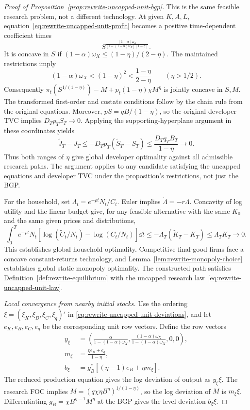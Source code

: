 \begin{proof}[Proof of Proposition~\ref{prop:rewrite-uncapped-unit-bgp}]
This is the same feasible research problem, not a different technology.
At given $K,A,L$, equation~\eqref{eq:rewrite-uncapped-unit-profit} becomes
a positive time-dependent coefficient times
\[
 S^{\frac{(1-\alpha)\omega_X}
 {[1-(1-\alpha)\omega_X](1-\eta)}}.
\]
It is concave in $S$ if
$(1-\alpha)\omega_X\leq(1-\eta)/(2-\eta)$. The maintained restrictions imply
\[
 (1-\alpha)\omega_X<(1-\eta)^2
 <\frac{1-\eta}{2-\eta}\qquad(\eta>1/2).
\]
Consequently $\pi_t(S^{1/(1-\eta)})-M+p_t(1-\eta)\chi M^\eta$
is jointly concave in $S,M$. The transformed first-order and costate
conditions follow by the chain rule from the original equations.
Moreover, $pS=qB/(1-\eta)$, so the original developer TVC implies
$D_Tp_TS_T\to0$. Applying the supporting-hyperplane argument in these
coordinates yields
\[
 \widetilde J_T-J_T
 \leq-D_Tp_T(\widetilde S_T-S_T)
 \leq\frac{D_Tq_TB_T}{1-\eta}\longrightarrow0.
\]
Thus both ranges of $\eta$ give global developer optimality against all
admissible research paths. The argument applies to any candidate satisfying
the uncapped equations and developer TVC under the proposition's
restrictions, not just the BGP.

For the household, set $\Lambda_t=e^{-\rho t}N_t/C_t$.
Euler implies $\dot\Lambda=-r\Lambda$.
Concavity of log utility and the linear budget give, for any feasible
alternative with the same $K_0$ and the same given prices and distributions,
\[
 \int_0^T e^{-\rho t}N_t
 \left[\log(\widetilde C_t/N_t)-\log(C_t/N_t)\right]\dd t
 \leq-\Lambda_T(\widetilde K_T-K_T)
 \leq\Lambda_TK_T\longrightarrow0.
\]
This establishes global household optimality. Competitive final-good firms
face a concave constant-returns technology, and
Lemma~\ref{lem:rewrite-monopoly-choice} establishes global static monopoly
optimality. The constructed path satisfies Definition~\ref{def:rewrite-equilibrium}
with the uncapped research law~\eqref{eq:rewrite-uncapped-unit-law}.

\medskip
\textit{Local convergence from nearby initial stocks.}
\label{proof:rewrite-uncapped-unit-local}
Use the ordering $\xi=(\xi_K,\xi_B,\xi_C,\xi_q)'$ in
\eqref{eq:rewrite-uncapped-unit-deviations}, and let $e_K,e_B,e_C,e_q$
be the corresponding unit row vectors. Define the row vectors
\begin{align}
 y_\xi&=\left(\frac{\alpha}{1-(1-\alpha)\omega_X},
 \frac{(1-\alpha)\omega_X}{1-(1-\alpha)\omega_X},0,0\right),
 \label{eq:rewrite-uncapped-unit-output-row}\\
 m_\xi&=\frac{\eta e_B+e_q}{1-\eta},
 \label{eq:rewrite-uncapped-unit-research-row}\\
 b_\xi&=g_B^*[(\eta-1)e_B+\eta m_\xi].
 \label{eq:rewrite-uncapped-unit-efficiency-row}
\end{align}
The reduced production equation gives the log deviation of output as
$y_\xi\xi$. The research FOC implies
$M=(q\chi\eta B^\eta)^{1/(1-\eta)}$, so the log deviation of $M$ is
$m_\xi\xi$. Differentiating $g_B=\chi B^{\eta-1}M^\eta$ at the BGP
gives the level deviation $b_\xi\xi$.


\end{proof}
